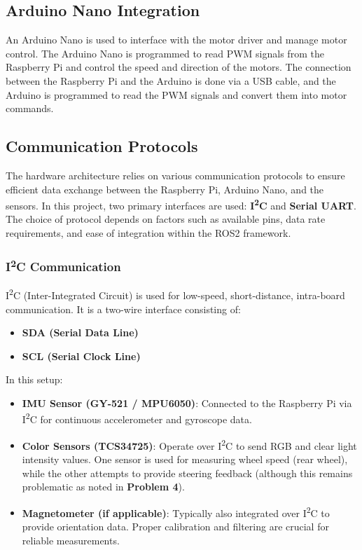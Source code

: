 \documentclass[english,project]{buwthesis}
\begin{document}
\subsection{Arduino Nano Integration}
\sloppy
An Arduino Nano is used to interface with the motor driver and manage motor control. The Arduino Nano is programmed to read PWM signals from the Raspberry Pi and control the speed and direction of the motors. The connection between the Raspberry Pi and the Arduino is done via a USB cable, and the Arduino is programmed to read the PWM signals and convert them into motor commands.


\subsection{Communication Protocols}

The hardware architecture relies on various communication protocols to ensure efficient data exchange between the Raspberry Pi, Arduino Nano, and the sensors. In this project, two primary interfaces are used: \textbf{I\textsuperscript{2}C} and \textbf{Serial UART}. The choice of protocol depends on factors such as available pins, data rate requirements, and ease of integration within the ROS2 framework.

\subsubsection{I\textsuperscript{2}C Communication}

I\textsuperscript{2}C (Inter-Integrated Circuit) is used for low-speed, short-distance, intra-board communication. It is a two-wire interface consisting of:
\begin{itemize}
    \item \textbf{SDA (Serial Data Line)}
    \item \textbf{SCL (Serial Clock Line)}
\end{itemize}

In this setup:
\begin{itemize}
    \item \textbf{IMU Sensor (GY-521 / MPU6050)}: Connected to the Raspberry Pi via I\textsuperscript{2}C for continuous accelerometer and gyroscope data.
    \item \textbf{Color Sensors (TCS34725)}: Operate over I\textsuperscript{2}C to send RGB and clear light intensity values. One sensor is used for measuring wheel speed (rear wheel), while the other attempts to provide steering feedback (although this remains problematic as noted in \textbf{Problem 4}).
    \item \textbf{Magnetometer (if applicable)}: Typically also integrated over I\textsuperscript{2}C to provide orientation data. Proper calibration and filtering are crucial for reliable measurements.
\end{itemize}
\end{document}
